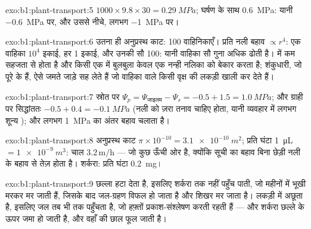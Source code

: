 \begin{solution}{exo:b1:plant-transport:5}
$1000\times 9.8\times 30 = \qty{0.29}{MPa}$; घर्षण के साथ
\qty{0.6}{MPa}: यानी  \qty{-0.6}{MPa} पर, और  उससे नीचे,
लगभग \qty{-1}{MPa} पर।
\end{solution}

\begin{solution}{exo:b1:plant-transport:6}
उतना ही अनुप्रस्थ काट: 100 वाहिनिकाएँ। प्रति नली बहाव $\propto r^4$: एक
वाहिका $10^4$ इकाई, हर  1 इकाई, और उनकी सौ 100:
यानी वाहिका सौ गुना अधिक ढोती है।  में  कम
सहजता से होता है और किसी एक में बुलबुला केवल एक नन्ही नलिका को बेकार करता
है; शंकुधारी, जो पूरे  के हैं, ऐसे जमते जाड़े सह लेते हैं जो
वाहिका वाले किसी वृक्ष की लकड़ी खाली कर देते हैं।
\end{solution}

\begin{solution}{exo:b1:plant-transport:7}
स्रोत पर $\Psi_p = \Psi_{\text{जाइलम}} - \Psi_s = -0.5 + 1.5 = \qty{1.0}{MPa}$;
और ग्राही पर सिद्धांततः $-0.5 + 0.4 = \qty{-0.1}{MPa}$
(नली को ज़रा तनाव चाहिए होता, यानी व्यवहार में लगभग शून्य
); और लगभग \qty{1}{MPa} का अंतर बहाव चलाता है।
\end{solution}

\begin{solution}{exo:b1:plant-transport:8}
अनुप्रस्थ काट $\pi\times 10^{-10} = \qty{3.1e-10}{m^2}$; प्रति घंटा
\qty{1}{\micro L} $= \qty{1e-9}{m^3}$: चाल $3.2\,\mathrm{m/h}$ --- जो
कुछ ऊँची ओर है, क्योंकि सूची का बहाव बिना छेड़ी नली के बहाव से तेज़ होता
है। शर्करा: प्रति घंटा \qty{0.2}{mg}।
\end{solution}

\begin{solution}{exo:b1:plant-transport:9}
छल्ला  हटा देता है, इसलिए शर्करा  तक नहीं पहुँच पाती,
जो महीनों में भूखी मरकर मर जाती हैं, जिसके बाद जल-ग्रहण विफल हो जाता है
और शिखर मर जाता है। लकड़ी में  अछूता है, इसलिए जल तब भी
 तक पहुँचता है, जो हफ़्तों प्रकाश-संश्लेषण करती रहती हैं --- और
शर्करा छल्ले के ऊपर जमा हो जाती है, और वहाँ की छाल फूल जाती है।
\end{solution}

